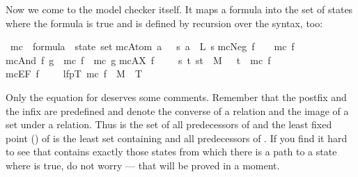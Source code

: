 \begin{isabellebody}
\begin{isamarkuptext}
Now we come to the model checker itself. It maps a formula into the set of
states where the formula is true and is defined by recursion over the syntax,
too:%
\end{isamarkuptext}%
\ mc\ {\isacharcolon}{\isacharcolon}\ {\isachardoublequote}formula\ {\isasymRightarrow}\ state\ set{\isachardoublequote}\isanewline
{}\isanewline
{\isachardoublequote}mc{\isacharparenleft}Atom\ a{\isacharparenright}\ \ {\isacharequal}\ {\isacharbraceleft}s{\isachardot}\ a\ {\isasymin}\ L\ s{\isacharbraceright}{\isachardoublequote}\isanewline
{\isachardoublequote}mc{\isacharparenleft}Neg\ f{\isacharparenright}\ \ \ {\isacharequal}\ {\isacharminus}mc\ f{\isachardoublequote}\isanewline
{\isachardoublequote}mc{\isacharparenleft}And\ f\ g{\isacharparenright}\ {\isacharequal}\ mc\ f\ {\isasyminter}\ mc\ g{\isachardoublequote}\isanewline
{\isachardoublequote}mc{\isacharparenleft}AX\ f{\isacharparenright}\ \ \ \ {\isacharequal}\ {\isacharbraceleft}s{\isachardot}\ {\isasymforall}t{\isachardot}\ {\isacharparenleft}s{\isacharcomma}t{\isacharparenright}\ {\isasymin}\ M\ \ {\isasymlongrightarrow}\ t\ {\isasymin}\ mc\ f{\isacharbraceright}{\isachardoublequote}\isanewline
{\isachardoublequote}mc{\isacharparenleft}EF\ f{\isacharparenright}\ \ \ \ {\isacharequal}\ lfp{\isacharparenleft}{\isasymlambda}T{\isachardot}\ mc\ f\ {\isasymunion}\ {\isacharparenleft}M{\isasyminverse}\ {\isacharbackquote}{\isacharbackquote}\ T{\isacharparenright}{\isacharparenright}{\isachardoublequote}%
\begin{isamarkuptext}%
\noindent
Only the equation for  deserves some comments. Remember that the
postfix \isa{{\isasyminverse}} and the infix \isa{{\isacharbackquote}{\isacharbackquote}} are predefined and denote the
converse of a relation and the image of a set under a relation.  Thus
 is the set of all predecessors of  and the least
fixed point () of  is the least set
 containing  and all predecessors of . If you
find it hard to see that  contains exactly those states from
which there is a path to a state where  is true, do not worry --- that
will be proved in a moment.


\end{isamarkuptext}
\end{isabellebody}
